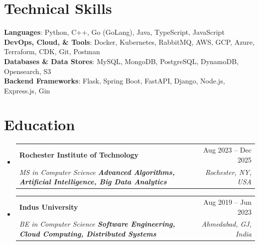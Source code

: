 \documentclass[letterpaper,10.5pt]{article}
\makeatletter
\newcommand{\resumeSubheading}[4]{
  \vspace{-2pt}\item
    \begin{tabular*}{0.97\textwidth}[t]{l@{\extracolsep{\fill}}r}
      \textbf{#1} & #2 \\
      \textit{\small#3} & \textit{\small #4} \\
    \end{tabular*}
}
\newcommand{\resumeSubHeadingListStart}{\begin{itemize}[leftmargin=0.15in, label={}]}
\newcommand{\resumeSubHeadingListEnd}{\end{itemize}}
\makeatother
\begin{document}
\section{Technical Skills}
 \begin{itemize}[leftmargin=0.15in, label={}]
    \small{\item{
     \textbf{Languages}{: Python, C++, Go (GoLang), Java, TypeScript, JavaScript} \\
     \textbf{DevOps, Cloud, \& Tools}{: Docker, Kubernetes, RabbitMQ, AWS, GCP, Azure, Terraform, CDK, Git, Postman} \\
     \textbf{Databases \& Data Stores}{: MySQL, MongoDB, PostgreSQL, DynamoDB, Opensearch, S3} \\
     \textbf{Backend Frameworks}{: Flask, Spring Boot, FastAPI, Django, Node.js, Express.js, Gin }
    }}
 \end{itemize}
\section{Education}
  \resumeSubHeadingListStart
    \resumeSubheading
      {Rochester Institute of Technology}{Aug 2023 -- Dec 2025}
      {MS in Computer Science \textbar{} \textbf{Advanced Algorithms, Artificial Intelligence, Big Data Analytics}}{Rochester, NY, USA}
      \vspace{-5pt}
    \resumeSubheading
      {Indus University}{Aug 2019 -- Jun 2023}
      {BE in Computer Science \textbar{} \textbf{Software Engineering, Cloud Computing, Distributed Systems}}{Ahmedabad, GJ, India}
      \vspace{-5pt}
  \resumeSubHeadingListEnd
\end{document}

